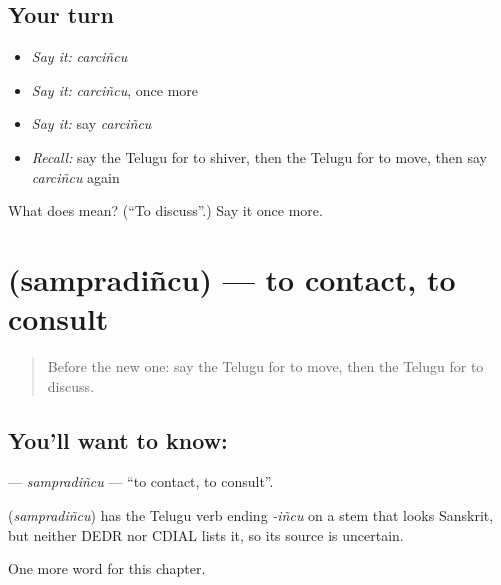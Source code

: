 \subsection*{Your turn}
\begin{itemize}
\raggedright
  \item \emph{Say it:} \emph{carciñcu}
  \item \emph{Say it:} \emph{carciñcu}, once more
  \item \emph{Say it:} say \emph{carciñcu}
  \item \emph{Recall:} say the Telugu for to shiver, then the Telugu for to move, then say \emph{carciñcu} again
\end{itemize}

\begin{tcolorbox}[breakable,colback=teal!4,colframe=teal!35!black,title={Before you move on}]
What does  mean? (\textquotedblleft{}To discuss\textquotedblright{}.) Say it once more.
\end{tcolorbox}
\section[\texorpdfstring{\te{సంప్రదించు} (sampradiñcu)}{సంప్రదించు (sampradiñcu)}]{ (sampradiñcu) — to contact, to consult}

\label{lesson:TE-C202-sampradincu}



\begin{quote}
Before the new one: say the Telugu for to move, then the Telugu for to discuss.
\end{quote}

\subsection*{You'll want to know: }
\textbf{} — \emph{sampradiñcu} — \textquotedblleft{}to contact, to consult\textquotedblright{}.

\begin{cousinweb}
\textbf{} (\emph{sampradiñcu}) has the Telugu verb ending \emph{-iñcu} on a stem that looks Sanskrit, but neither DEDR nor CDIAL lists it, so its source is uncertain.
\end{cousinweb}

\begin{grammarlens}[title={What you've built}]
One more word for this chapter.
\end{grammarlens}

